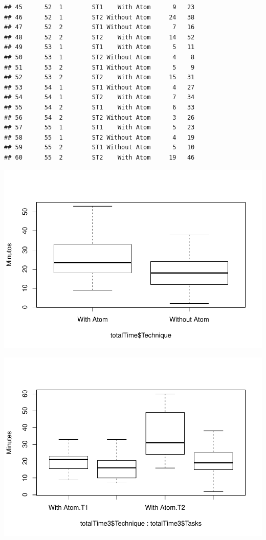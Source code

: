 \documentclass[]{article}
\begin{document}
\begin{verbatim}
## 45      52  1        ST1    With Atom      9   23
## 46      52  1        ST2 Without Atom     24   38
## 47      52  2        ST1 Without Atom      7   16
## 48      52  2        ST2    With Atom     14   52
## 49      53  1        ST1    With Atom      5   11
## 50      53  1        ST2 Without Atom      4    8
## 51      53  2        ST1 Without Atom      5    9
## 52      53  2        ST2    With Atom     15   31
## 53      54  1        ST1 Without Atom      4   27
## 54      54  1        ST2    With Atom      7   34
## 55      54  2        ST1    With Atom      6   33
## 56      54  2        ST2 Without Atom      3   26
## 57      55  1        ST1    With Atom      5   23
## 58      55  1        ST2 Without Atom      4   19
## 59      55  2        ST1 Without Atom      5   10
## 60      55  2        ST2    With Atom     19   46
\end{verbatim}

\includegraphics{main_files/figure-latex/unnamed-chunk-5-1.pdf}

\includegraphics{main_files/figure-latex/unnamed-chunk-6-1.pdf}
\end{document}
